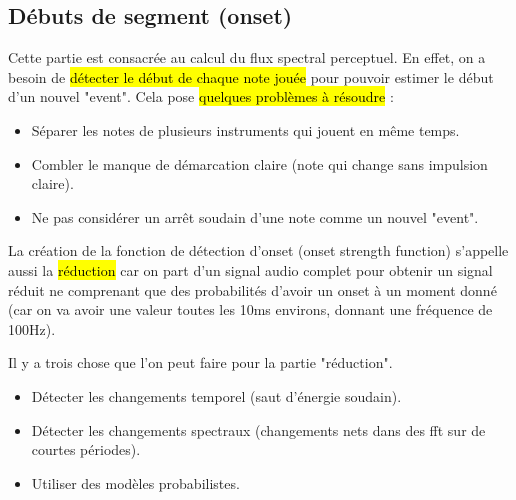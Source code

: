 \documentclass[letterpaper, 12pt]{article}
\newcommand{\alinea}{
\hspace*{0.5cm}}
\begin{document}
		\subsection{Débuts de segment (onset)}	
			\alinea Cette partie est consacrée au calcul du flux spectral perceptuel. En effet, on a besoin de \hl{détecter le début de chaque
				note jouée} pour pouvoir estimer le début d'un nouvel "event". Cela pose \hl{quelques problèmes à résoudre} : 
				\begin{itemize}
					\setlength\itemsep{0cm}
					\item Séparer les notes de plusieurs instruments qui jouent en même temps.
					\item Combler le manque de démarcation claire (note qui change sans impulsion claire).
					\item Ne pas considérer un arrêt soudain d'une note comme un nouvel "event".
				\end{itemize}
			\alinea La création de la fonction de détection d'onset (onset strength function) s'appelle aussi la \hl{réduction} car on 
				part d'un signal audio complet pour obtenir un signal réduit ne comprenant que des probabilités d'avoir un onset à un 
				moment donné (car on va avoir une valeur toutes les 10ms environs, donnant une fréquence de 100Hz).\\
			\begin{minipage}{0.55\textwidth}
				\alinea Il y a trois chose que l'on peut faire pour la partie "réduction".
				\begin{itemize}
					\setlength\itemsep{0cm}
					\item Détecter les changements temporel (saut d'énergie soudain).
					\item Détecter les changements spectraux (changements nets dans des fft sur de courtes périodes).
					\item Utiliser des modèles probabilistes.
				\end{itemize}
			\end{minipage} \hfill
\end{document}
